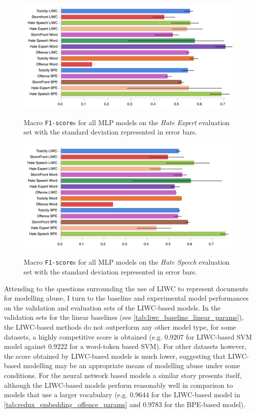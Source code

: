 \begin{figure}
\begin{minipage}{\textwidth}
\centering
    \includegraphics[width=\textwidth]{all_mlp_waseem_test.pdf}
    \caption{Macro \texttt{F1-score}s for all MLP models on the \textit{Hate Expert} evaluation set with the standard deviation represented in error bars.}
    \label{fig:waseem_mlp_test}
    \vfill
      \includegraphics[width=\textwidth]{all_mlp_waseem_hovy_test.pdf}
  \caption{Macro \texttt{F1-score}s for all MLP models on the \textit{Hate Speech} evaluation set with the standard deviation represented in error bars.}
  \label{fig:waseem_hovy_mlp_test}
\end{minipage}
\end{figure}
Attending to the questions surrounding the use of LIWC to represent documents for modelling abuse, I turn to the baseline and experimental model performances on the validation and evaluation sets of the LIWC-based models. In the validation sets for the linear baselines (see \cref{tab:liwc_baseline_linear_params}), the LIWC-based methods do not outperform any other model type, for some datasets, a highly competitive score is obtained (e.g. $0.9207$ for LIWC-based SVM model against $0.9222$ for a word-token based SVM). For other datasets however, the score obtained by LIWC-based models is much lower, suggesting that LIWC-based modelling may be an appropriate means of modelling abuse under some conditions.
For the neural network based models a similar story presents itself, although the LIWC-based models perform reasonably well in comparison to models that use a larger vocabulary (e.g. $0.9644$ for the LIWC-based model in \cref{tab:redux_embedding_offence_params} and $0.9783$ for the BPE-based model).

